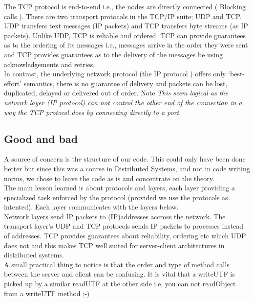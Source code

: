 The TCP protocol is end-to-end i.e., the nodes are directly connected ( Blocking calls ).  
There are two transport protocols in the TCP/IP suite; UDP and TCP. UDP transfers text messages (IP packets) and TCP transfers byte streams (as IP packets). Unlike UDP, TCP is reliable and ordered. TCP can provide guarantees as to the ordering of its messages i.e., messages arrive in the order they were sent and TCP provides guarantees as to the delivery of the messages be using acknowledgements and retries.   \\

In contrast, the underlying network protocol (the IP protocol ) offers only ‘best-effort’ semantics, there is no guarantee of delivery and packets can be lost, duplicated, delayed or delivered out of order. Note \textit{This seem logical as the network layer (IP protocol) can not control the other end of the connection in a way the TCP protocol does by connecting directly to a port}. 



\pagebreak
\subsection{Good and bad}
\label{tcp_conclusion}

A source of concern is the structure of our code. This could only have been done better but since this was a course in Distributed Systems, and not in code writing norms, we chose to leave the code as is and concentrate on the theory.  \\

The main lesson learned is about protocols and layers, each layer providing a specialized task enforced by the protocol (provided we use the protocols as intented). Each layer communicates with the layers below. \\

Network layers send IP packets to (IP)addresses accross the network. The transport layer's UDP and TCP protocols sends IP packets to processes instead of addresses. TCP provides guarantees about reliability, ordering etc which UDP does not and this makes TCP well suited for server-client architectures in distributed systems. \\

A small practical thing to notice is that the order and type of method calls between the server and client can be confusing. It is vital that a writeUTF is picked up by a similar readUTF at the other side i.e, you can not readObject from a writeUTF method ;-) \\ 




